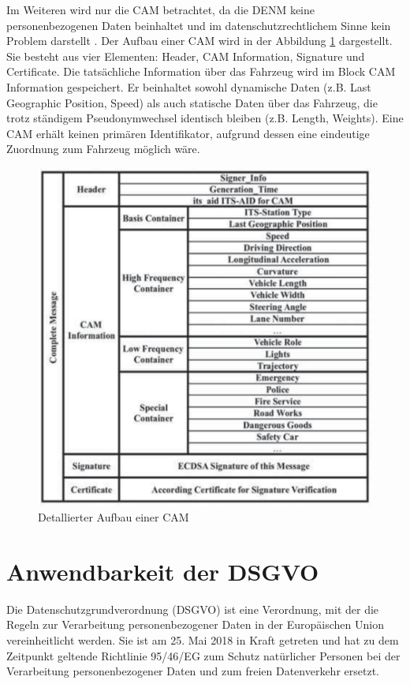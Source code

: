 Im Weiteren wird nur die CAM betrachtet, da die DENM keine personenbezogenen Daten beinhaltet und im datenschutzrechtlichem Sinne kein Problem darstellt \cite{Kiometzis2017}. Der Aufbau einer CAM wird in der Abbildung \ref{fig:cam} dargestellt. Sie besteht aus vier Elementen: Header, CAM Information, Signature und Certificate. Die tatsächliche Information über das Fahrzeug wird im Block CAM Information gespeichert. Er beinhaltet sowohl dynamische Daten (z.B. Last Geographic Position, Speed) als auch statische Daten über das Fahrzeug, die trotz ständigem Pseudonymwechsel identisch bleiben (z.B. Length, Weights). Eine CAM erhält keinen primären Identifikator, aufgrund dessen eine eindeutige Zuordnung zum Fahrzeug möglich wäre.

\begin{figure}
	\centering
	\includegraphics[width=0.4\linewidth]{images/CAM}
	\caption[Detallierter Aufbau einer CAM]{Detallierter Aufbau einer CAM \footnotemark}
	\label{fig:cam}
\end{figure}


\section{Anwendbarkeit der DSGVO}
\label{ch:SecondContentSection}

Die Datenschutzgrundverordnung (DSGVO) ist eine Verordnung, mit der die Regeln zur Verarbeitung personenbezogener Daten in der Europäischen Union vereinheitlicht werden. Sie ist am 25. Mai 2018 in Kraft getreten und hat zu dem Zeitpunkt geltende Richtlinie 95/46/EG zum Schutz natürlicher Personen bei der Verarbeitung personenbezogener Daten und zum freien Datenverkehr ersetzt. 

